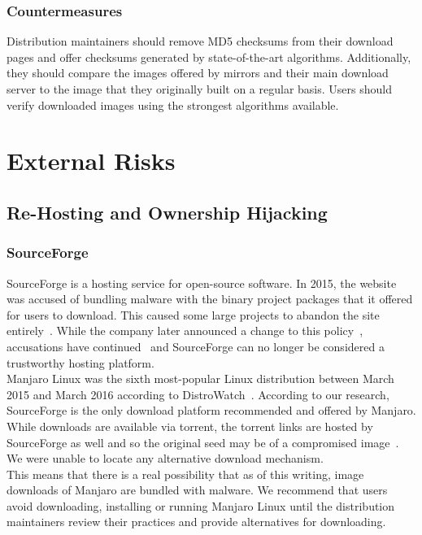 \documentclass[conference]{IEEEtran}
\begin{document}
\subsubsection{Countermeasures}

Distribution maintainers should remove MD5 checksums from their download pages and offer
checksums generated by state-of-the-art algorithms. Additionally, they should compare the
images offered by mirrors and their main download server to the image that they originally
built on a regular basis. Users should verify downloaded images using the strongest algorithms
available.

\section{External Risks}

\subsection{Re-Hosting and Ownership Hijacking}

\subsubsection{SourceForge}

SourceForge is a hosting service for open-source software. In 2015, the
website was accused of bundling malware with the binary project packages
that it offered for users to download. This caused some large projects to
abandon the site entirely~\cite{GIMPSourceForge}. While the company later
announced a change to this policy~\cite{SourceForgePolicy}, accusations
have continued~\cite{NmapSourceForge} and SourceForge can no longer be considered
a trustworthy hosting platform.\\
\indent Manjaro Linux was the sixth most-popular Linux distribution between March 2015
and March 2016 according to DistroWatch~\cite{DistroWatch}. According to our research,
SourceForge is the only download platform recommended and offered by
Manjaro. While downloads are available via torrent, the torrent
links are hosted by SourceForge as well and so the original seed may be of a compromised
image~\cite{ManjaroDownload}. We were unable to locate any alternative download mechanism.\\
\indent This means that there is a real possibility that as of this writing, image downloads
of Manjaro are bundled with malware. We recommend that users avoid downloading, installing
or running Manjaro Linux until the distribution maintainers review their practices and
provide alternatives for downloading.
\end{document}
